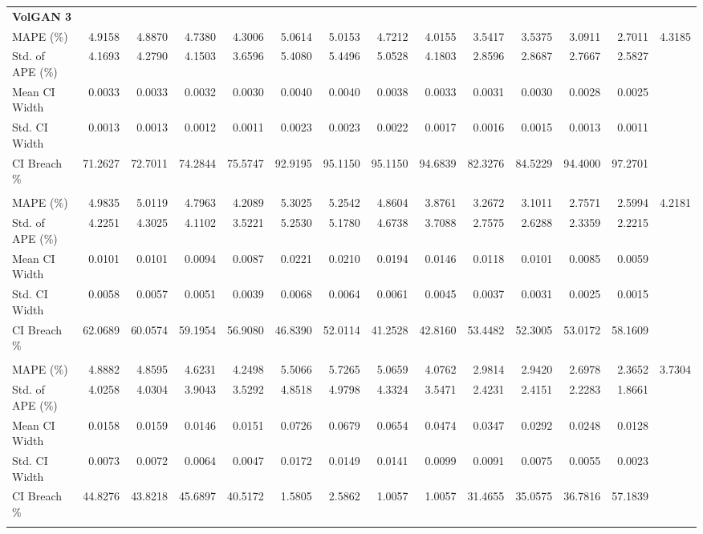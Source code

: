 \documentclass{article}
\begin{document}
\begin{table}[h!]
{\begin{tabular}{l rrrrrrrrrrrrr}
\multicolumn{14}{l}{\textbf{VolGAN 3}} \\
MAPE (\%) & 4.9158 & 4.8870 & 4.7380 & 4.3006 & 5.0614 & 5.0153 & 4.7212 & 4.0155 & 3.5417 & 3.5375 & 3.0911 & 2.7011 & 4.3185 \\
Std. of APE (\%) & 4.1693 & 4.2790 & 4.1503 & 3.6596 & 5.4080 & 5.4496 & 5.0528 & 4.1803 & 2.8596 & 2.8687 & 2.7667 & 2.5827 &  \\
Mean CI Width & 0.0033 & 0.0033 & 0.0032 & 0.0030 & 0.0040 & 0.0040 & 0.0038 & 0.0033 & 0.0031 & 0.0030 & 0.0028 & 0.0025 &  \\
Std. CI Width & 0.0013 & 0.0013 & 0.0012 & 0.0011 & 0.0023 & 0.0023 & 0.0022 & 0.0017 & 0.0016 & 0.0015 & 0.0013 & 0.0011 &  \\
CI Breach \% & 71.2627 & 72.7011 & 74.2844 & 75.5747 & 92.9195 & 95.1150 & 95.1150 & 94.6839 & 82.3276 & 84.5229 & 94.4000 & 97.2701 &  \\
\addlinespace

\multicolumn{14}{l}{\textbf{VolGAN 4}} \\
MAPE (\%) & 4.9835 & 5.0119 & 4.7963 & 4.2089 & 5.3025 & 5.2542 & 4.8604 & 3.8761 & 3.2672 & 3.1011 & 2.7571 & 2.5994 & 4.2181 \\
Std. of APE (\%) & 4.2251 & 4.3025 & 4.1102 & 3.5221 & 5.2530 & 5.1780 & 4.6738 & 3.7088 & 2.7575 & 2.6288 & 2.3359 & 2.2215 &  \\
Mean CI Width & 0.0101 & 0.0101 & 0.0094 & 0.0087 & 0.0221 & 0.0210 & 0.0194 & 0.0146 & 0.0118 & 0.0101 & 0.0085 & 0.0059 &  \\
Std. CI Width & 0.0058 & 0.0057 & 0.0051 & 0.0039 & 0.0068 & 0.0064 & 0.0061 & 0.0045 & 0.0037 & 0.0031 & 0.0025 & 0.0015 &  \\
CI Breach \% & 62.0689 & 60.0574 & 59.1954 & 56.9080 & 46.8390 & 52.0114 & 41.2528 & 42.8160 & 53.4482 & 52.3005 & 53.0172 & 58.1609 &  \\
\addlinespace

\multicolumn{14}{l}{\textbf{VolGAN 5}} \\
MAPE (\%) & 4.8882 & 4.8595 & 4.6231 & 4.2498 & 5.5066 & 5.7265 & 5.0659 & 4.0762 & 2.9814 & 2.9420 & 2.6978 & 2.3652 & 3.7304 \\
Std. of APE (\%) & 4.0258 & 4.0304 & 3.9043 & 3.5292 & 4.8518 & 4.9798 & 4.3324 & 3.5471 & 2.4231 & 2.4151 & 2.2283 & 1.8661 &  \\
Mean CI Width & 0.0158 & 0.0159 & 0.0146 & 0.0151 & 0.0726 & 0.0679 & 0.0654 & 0.0474 & 0.0347 & 0.0292 & 0.0248 & 0.0128 &  \\
Std. CI Width & 0.0073 & 0.0072 & 0.0064 & 0.0047 & 0.0172 & 0.0149 & 0.0141 & 0.0099 & 0.0091 & 0.0075 & 0.0055 & 0.0023 &  \\
CI Breach \% & 44.8276 & 43.8218 & 45.6897 & 40.5172 & 1.5805 & 2.5862 & 1.0057 & 1.0057 & 31.4655 & 35.0575 & 36.7816 & 57.1839 &  \\
\addlinespace


\end{tabular}}
\end{table}
\end{document}
